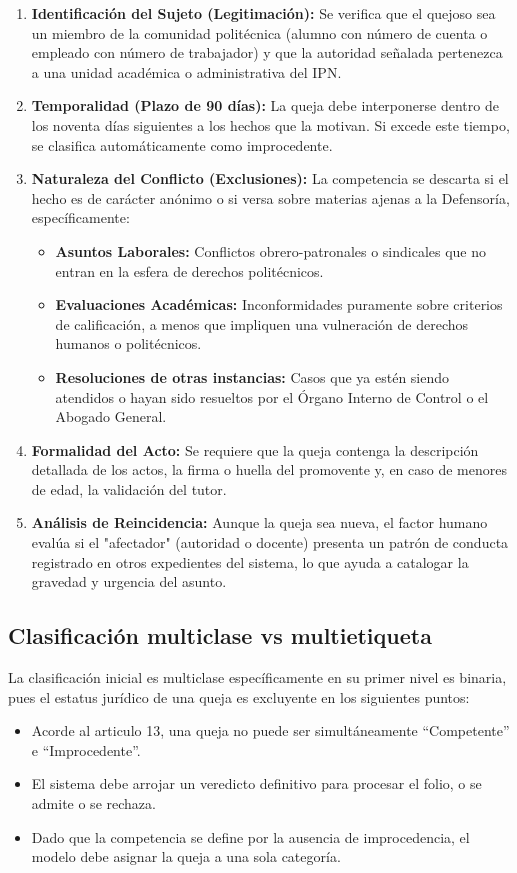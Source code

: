 \begin{enumerate}
    \item \textbf{Identificación del Sujeto (Legitimación):} Se verifica que el quejoso sea un miembro de la comunidad politécnica (alumno con número de cuenta o empleado con número de trabajador) y que la autoridad señalada pertenezca a una unidad académica o administrativa del IPN.
    \item \textbf{Temporalidad (Plazo de 90 días):} La queja debe interponerse dentro de los noventa días siguientes a los hechos que la motivan. Si excede este tiempo, se clasifica automáticamente como improcedente.
    \item \textbf{Naturaleza del Conflicto (Exclusiones):} La competencia se descarta si el hecho es de carácter anónimo o si versa sobre materias ajenas a la Defensoría, específicamente:
    \begin{itemize}
        \item[3.1.] \textbf{Asuntos Laborales:} Conflictos obrero-patronales o sindicales que no entran en la esfera de derechos politécnicos.
        \item[3.2.] \textbf{Evaluaciones Académicas:} Inconformidades puramente sobre criterios de calificación, a menos que impliquen una vulneración de derechos humanos o politécnicos.
        \item[3.3.] \textbf{Resoluciones de otras instancias:} Casos que ya estén siendo atendidos o hayan sido resueltos por el Órgano Interno de Control o el Abogado General.
    \end{itemize}
    \item \textbf{Formalidad del Acto:} Se requiere que la queja contenga la descripción detallada de los actos, la firma o huella del promovente y, en caso de menores de edad, la validación del tutor.
    \item \textbf{Análisis de Reincidencia:} Aunque la queja sea nueva, el factor humano evalúa si el "afectador" (autoridad o docente) presenta un patrón de conducta registrado en otros expedientes del sistema, lo que ayuda a catalogar la gravedad y urgencia del asunto.
\end{enumerate}

\subsection{Clasificación multiclase vs multietiqueta}

La clasificación inicial es multiclase específicamente en su primer nivel es binaria, pues el estatus jurídico de una queja es excluyente en los siguientes puntos:
\begin{itemize}
    \item Acorde al articulo 13, una queja no puede ser simultáneamente “Competente” e “Improcedente”.
    \item El sistema debe arrojar un veredicto definitivo para procesar el folio, o se admite o se rechaza.
    \item Dado que la competencia se define por la ausencia de improcedencia, el modelo debe asignar la queja a una sola categoría.
\end{itemize}

